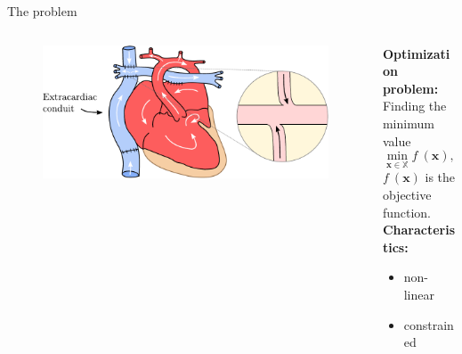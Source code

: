 \documentclass[aspectratio=169,xcolor=dvipsnames]{beamer}
\newcommand{\vect}[1]{\mathbf{#1}}
\begin{document}
\begin{frame}{The problem}
	\begin{columns}[T] %
		\begin{column}{.63\textwidth}
			\begin{figure}
				\includegraphics[width=0.9\linewidth]{Images/srdce_zoom.pdf}
			\end{figure}
		\end{column}%
		\hfill%
		\begin{column}{.37\textwidth}
			\vspace{0pt}
			\textbf{Optimization problem:}\\
			\vspace{6pt}
			Finding the minimum value
			\begin{equation*}
				\min _{\vect{x} \in \mathbb{X} } f \ (\vect{x}),
			\end{equation*}
			$ f \ (\vect{x}) $ is the objective function.\\ \pause
			\vspace{11pt}
			\textbf{Characteristics:}\\[2pt]
			\begin{itemize}
				\item non-linear
				\item constrained
			\end{itemize}
		\end{column}%
	\end{columns}
\end{frame}

\end{document}
